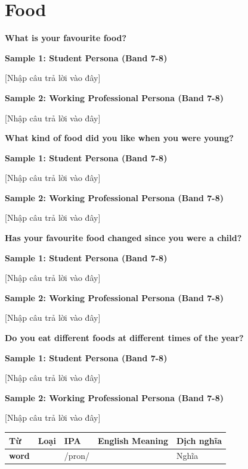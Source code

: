 \section{Food}
\begin{ieltsquestion}
\textbf{What is your favourite food?}
\end{ieltsquestion}
\textbf{Sample 1: Student Persona (Band 7-8)}

[Nhập câu trả lời vào đây]

\textbf{Sample 2: Working Professional Persona (Band 7-8)}

[Nhập câu trả lời vào đây]

\separator

\begin{ieltsquestion}
\textbf{What kind of food did you like when you were young?}
\end{ieltsquestion}
\textbf{Sample 1: Student Persona (Band 7-8)}

[Nhập câu trả lời vào đây]

\textbf{Sample 2: Working Professional Persona (Band 7-8)}

[Nhập câu trả lời vào đây]

\separator

\begin{ieltsquestion}
\textbf{Has your favourite food changed since you were a child?}
\end{ieltsquestion}
\textbf{Sample 1: Student Persona (Band 7-8)}

[Nhập câu trả lời vào đây]

\textbf{Sample 2: Working Professional Persona (Band 7-8)}

[Nhập câu trả lời vào đây]

\separator

\begin{ieltsquestion}
\textbf{Do you eat different foods at different times of the year?}
\end{ieltsquestion}
\textbf{Sample 1: Student Persona (Band 7-8)}

[Nhập câu trả lời vào đây]

\textbf{Sample 2: Working Professional Persona (Band 7-8)}

[Nhập câu trả lời vào đây]

\separator


\vspace{0.8em}
\begin{center}
\renewcommand{\arraystretch}{1.65}
\begin{tabularx}{\textwidth}{|V{0.22\textwidth}|C{0.07\textwidth}|I{0.20\textwidth}|Y|V{0.18\textwidth}|}
\hline
{}
\textbf{Từ} & \textbf{Loại} & \textbf{IPA} & \textbf{English Meaning} & \textbf{Dịch nghĩa} \\
\hline
\textbf{word} &  & /pron/ &  & Nghĩa \\ \hline
\end{tabularx}
\end{center}

